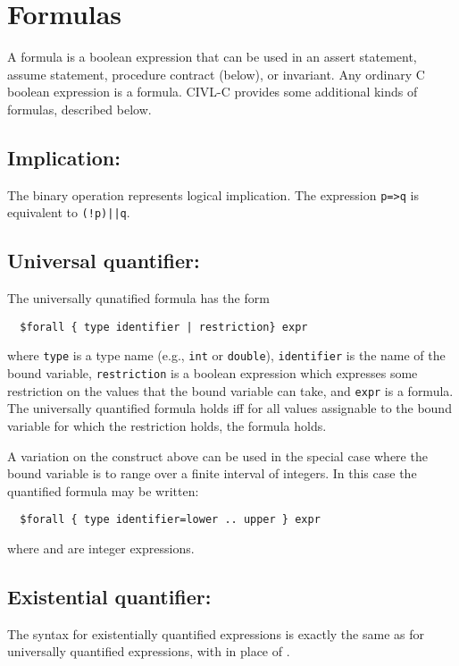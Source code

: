 \section{Formulas}

A formula is a boolean expression that can be used in an assert
statement, assume statement, procedure contract (below), or invariant.
Any ordinary C boolean expression is a formula. CIVL-C provides some
additional kinds of formulas, described below.

\subsection{Implication: \cimplies}

The binary operation \cimplies{} represents logical implication.
The expression \verb!p=>q! is equivalent to \verb~(!p)||q~.

\subsection{Universal quantifier: \cforall}

The universally qunatified formula has the form
\begin{verbatim}
  $forall { type identifier | restriction} expr
\end{verbatim}
where \verb!type! is a type name (e.g., \texttt{int} or
\texttt{double}), \verb!identifier! is the name of the bound variable,
\verb!restriction! is a boolean expression which expresses some
restriction on the values that the bound variable can take, and
\verb!expr! is a formula.  The universally quantified formula
holds iff for all values assignable to the bound variable
for which the restriction holds, the formula  holds.

A variation on the construct above can be used in the special case
where the bound variable is to range over a finite interval
of integers.  In this case the quantified formula may be written:
\begin{verbatim}
  $forall { type identifier=lower .. upper } expr
\end{verbatim}
where  and  are integer expressions.

\subsection{Existential quantifier: \cexists}

The syntax for existentially quantified expressions is exactly the
same as for universally quantified expressions, with \cexists{} in
place of \cforall{}.

